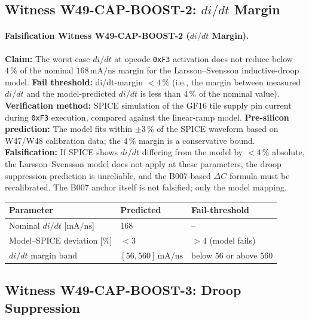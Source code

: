 \documentclass[12pt,a4paper]{report}
\theoremstyle{plain}
\theoremstyle{definition}
\theoremstyle{remark}
\newcommand{\deltaC}{\Delta C}
\begin{document}
\subsection{Witness W49-CAP-BOOST-2: $di/dt$ Margin}

\paragraph{Falsification Witness W49-CAP-BOOST-2 ($di/dt$ Margin).}
\label{fw:2}
\textbf{Claim:} The worst-case $di/dt$ at opcode \texttt{0xF3} activation
does not reduce below $4\,\%$ of the nominal $168\,\mathrm{mA/ns}$ margin
for the Larsson--Svensson \citep{larsson_svensson_1994} inductive-droop model.
\textbf{Fail threshold:} di/dt-margin $< 4\,\%$
(i.e., the margin between measured $di/dt$ and the model-predicted $di/dt$
is less than $4\,\%$ of the nominal value).
\textbf{Verification method:} SPICE simulation of the GF16 tile supply pin
current during \texttt{0xF3} execution, compared against the linear-ramp model.
\textbf{Pre-silicon prediction:} The model fits within $\pm 3\,\%$ of the
SPICE waveform based on W47/W48 calibration data; the $4\,\%$ margin is
a conservative bound.
\textbf{Falsification:} If SPICE shows $di/dt$ differing from the model by
$< 4\,\%$ absolute, the Larsson--Svensson model does not apply at these parameters,
the droop suppression prediction is unreliable, and the B007-based
$\deltaC$ formula must be recalibrated.
The B007 anchor itself is not falsified; only the model mapping.

\begin{center}
\begin{tabular}{lll}
  \toprule
  Parameter & Predicted & Fail-threshold \\
  \midrule
  Nominal $di/dt$ [$\mathrm{mA/ns}$] & 168 & -- \\
  Model--SPICE deviation [$\%$] & $< 3$ & $> 4$ (model fails) \\
  $di/dt$ margin band & $[56, 560]\,\mathrm{mA/ns}$ & below $56$ or above $560$ \\
  \bottomrule
\end{tabular}
\end{center}

\subsection{Witness W49-CAP-BOOST-3: Droop Suppression}
\end{document}
